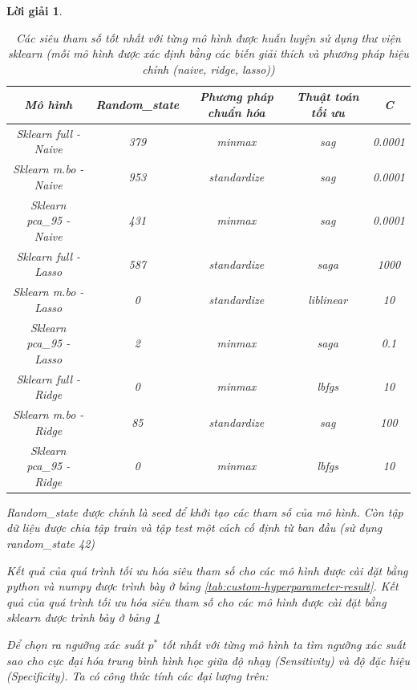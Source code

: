 \documentclass[14pt, a4paper]{article}
\theoremstyle{sltheorem}
\theoremstyle{soltheorem}
\newtheorem*{loigiai}{Lời giải}
\begin{document}
\begin{loigiai}
    \begin{table}[h!]
        \centering
        \begin{tabular}{|c | c | c | c | c |}
            \hline
            Mô hình & Random\_state & Phương pháp chuẩn hóa & Thuật toán tối ưu & C \\
            \hline
            \hline
            Sklearn full - Naive & 379 & minmax & sag & 0.0001 \\
            \hline
            Sklearn m.bo - Naive & 953 & standardize & sag & 0.0001 \\
            \hline
            Sklearn pca\_95 - Naive & 431 & minmax & sag & 0.0001 \\
            \hline
            Sklearn full - Lasso & 587 & standardize & saga & 1000 \\
            \hline
            Sklearn m.bo - Lasso & 0 & standardize & liblinear & 10 \\
            \hline
            Sklearn pca\_95 - Lasso & 2 & minmax & saga & 0.1 \\
            \hline
            Sklearn full - Ridge & 0 & minmax & lbfgs & 10 \\
            \hline
            Sklearn m.bo - Ridge & 85 & standardize & sag & 100 \\
            \hline
            Sklearn pca\_95 - Ridge & 0 & minmax & lbfgs & 10 \\
            \hline
        \end{tabular}
        \caption{Các siêu tham số tốt nhất với từng mô hình được huấn luyện sử dụng thư viện sklearn (mỗi mô hình được xác định bằng các biến giải thích và phương pháp hiệu chỉnh (naive, ridge, lasso))}
        \label{tab:sklearn-hyperparameter-result}
    \end{table}

    Random\_state được chính là seed để khởi tạo các tham số của mô hình.
    Còn tập dữ liệu được chia tập train và tập test một cách cố định từ ban đầu (sử dụng random\_state 42)

    Kết quả của quá trình tối ưu hóa siêu tham số cho các mô hình được cài đặt bằng python và numpy được trình bày ở bảng \ref{tab:custom-hyperparameter-result}.
    Kết quả của quá trình tối ưu hóa siêu tham số cho các mô hình được cài đặt bằng sklearn được trình bày ở bảng \ref{tab:sklearn-hyperparameter-result}

    Để chọn ra ngưỡng xác suất $p^*$ tốt nhất với từng mô hình ta tìm ngưỡng xác suất sao cho cực đại hóa trung bình hình học giữa độ nhạy (Sensitivity) và độ đặc hiệu (Specificity).
    Ta có công thức tính các đại lượng trên:


\end{loigiai}
\end{document}
